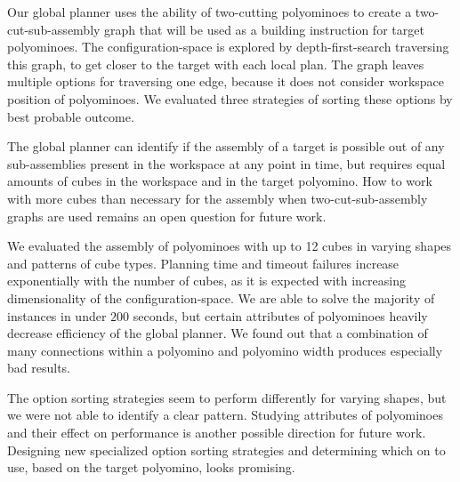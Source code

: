 Our global planner uses the ability of two-cutting polyominoes to create a two-cut-sub-assembly graph that will be used as a building instruction for target polyominoes.
The configuration-space is explored by depth-first-search traversing this graph, to get closer to the target with each local plan.
The graph leaves multiple options for traversing one edge, because it does not consider workspace position of polyominoes. 
We evaluated three strategies of sorting these options by best probable outcome.

The global planner can identify if the assembly of a target is possible out of any sub-assemblies present in the workspace at any point in time, but requires equal amounts of cubes in the workspace and in the target polyomino.
How to work with more cubes than necessary for the assembly when two-cut-sub-assembly graphs are used remains an open question for future work.

We evaluated the assembly of polyominoes with up to 12 cubes in varying shapes and patterns of cube types.
Planning time and timeout failures increase exponentially with the number of cubes, as it is expected with increasing dimensionality of the configuration-space.
We are able to solve the majority of instances in under $200$ seconds, but certain attributes of polyominoes heavily decrease efficiency of the global planner.
We found out that a combination of many connections within a polyomino and polyomino width produces especially bad results.

The option sorting strategies seem to perform differently for varying shapes, but we were not able to identify a clear pattern.
Studying attributes of polyominoes and their effect on performance is another possible direction for future work.
Designing new specialized option sorting strategies and determining which on to use, based on the target polyomino, looks promising. 

